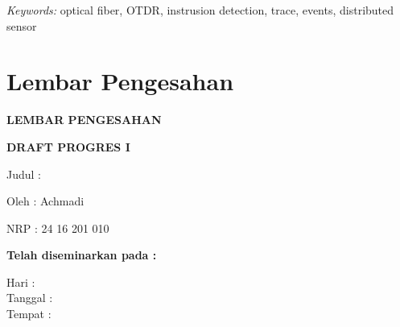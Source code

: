 \documentclass[12pt]{article}
\providecommand{\keyworden}[1]{\textit{Keywords: } #1}
\begin{document}
	\keyworden{optical fiber, OTDR, instrusion detection, trace, events, distributed sensor}
	
\newpage
\thispagestyle{plain}
\mbox{}

\newpage

	\section{Lembar Pengesahan}
	
	\begin{center}
		\textbf{LEMBAR PENGESAHAN}
	\end{center}
	
	\begin{center}
		\textbf{DRAFT PROGRES I}
	\end{center}

	\vspace{10pt}

	\begin{flushleft}
		\hspace{50pt} Judul	: 
	\end{flushleft}

	\begin{flushleft}
		\hspace{50pt} Oleh : Achmadi
	\end{flushleft}

	\begin{flushleft}
		\hspace{50pt} NRP : 24 16 201 010
	\end{flushleft}

	\vspace{20pt}
	
	\begin{center}
		\textbf{Telah diseminarkan pada :}
	\end{center}

	\vspace{10pt}

	\begin{flushleft}
		Hari \hspace{17pt}: \\
		Tanggal :\\
		Tempat \hspace{3pt}:  \\
	\end{flushleft}
\end{document}
